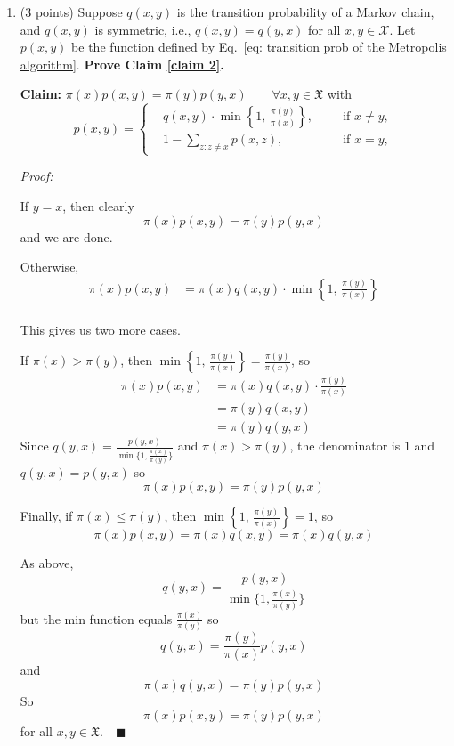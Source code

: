 \documentclass[11pt,letterpaper, leqno]{article}
\numberwithin{equation}{section}
\numberwithin{theorem}{section}
\numberwithin{lemma}{section}
\numberwithin{corollary}{section}
\numberwithin{definition}{section}
\numberwithin{proposition}{section}
\numberwithin{remark}{section}
\numberwithin{example}{section}
\renewcommand{\qed}{\quad \blacksquare}
\newcommand{\mfX}{\mathfrak{X}}
\begin{document}
\begin{enumerate}
\pagebreak

\item (3 points) Suppose $q(x,y)$ is the transition probability of a Markov chain, and $q(x,y)$ is symmetric, i.e., $q(x,y)=q(y,x)$ for all $x,y\in\mathcal{X}$. Let $p(x,y)$ be the function defined by Eq.~\eqref{eq: transition prob of the Metropolis algorithm}. \textbf{Prove Claim \ref{claim 2}.}

    \color{blue}
        \textbf{Claim:} $\pi(x)p(x, y) = \pi(y) p(y, x) \qquad \forall x, y\in \mfX$ with 
        \[p(x,y) = \left\{
            \begin{aligned}
                & q(x,y)\cdot\min\left\{1, \, \frac{\pi(y)}{\pi(x)}\right\},\ \ &&\mbox{ if }x\ne y, \\
                & 1-\sum_{z:z\ne x} p(x,z),\ \ &&\mbox{ if }x=y,
            \end{aligned}
            \right.\]

        \emph{Proof:}
        
        If $y = x$, then clearly 
        \[\pi(x)p(x, y) = \pi(y) p(y, x)\]
        and we are done. 

        Otherwise, 
        \begin{align*}
            \pi(x)p(x, y) &= \pi(x) q(x,y)\cdot\min\left\{1, \, \frac{\pi(y)}{\pi(x)}\right\}\\
        \end{align*}

        This gives us two more cases.

        If $\pi(x) > \pi(y)$, then $\min\left\{1, \, \frac{\pi(y)}{\pi(x)}\right\} = \frac{\pi(y)}{\pi(x)}$, so
        \begin{align*}
            \pi(x)p(x, y) &= \pi(x)q(x, y)\cdot \frac{\pi(y)}{\pi(x)}\\
            &= \pi(y)q(x, y)\\
            &= \pi(y)q(y, x)
        \end{align*}
        Since $q(y, x) = \frac{p(y, x)}{\min\{1, \frac{\pi(x)}{\pi(y)}\}}$
        and $\pi(x) > \pi(y)$, the denominator is $1$ and $q(y, x) = p(y, x)$ so
        \[\pi(x)p(x, y) = \pi(y)p(y, x)\]

        Finally, if $\pi(x) \leq \pi(y)$, then $\min\left\{1, \, \frac{\pi(y)}{\pi(x)}\right\} = 1$, so 
        \[\pi(x)p(x, y) = \pi(x)q(x, y) = \pi(x)q(y, x)\]

        As above, 
        \[q(y, x) = \frac{p(y, x)}{\min\{1, \frac{\pi(x)}{\pi(y)}\}}\]
        but the min function equals $\frac{\pi(x)}{\pi(y)}$ so 
        \[q(y, x) = \frac{\pi(y)}{\pi(x)} p(y, x)\]
        and 
        \[\pi(x)q(y, x) = \pi(y)p(y,x)\]
        So 
        \[\pi(x)p(x, y) = \pi(y)p(y, x)\]
        for all $x, y \in \mfX. \qed$
    \color{black}


\end{enumerate}
\end{document}
